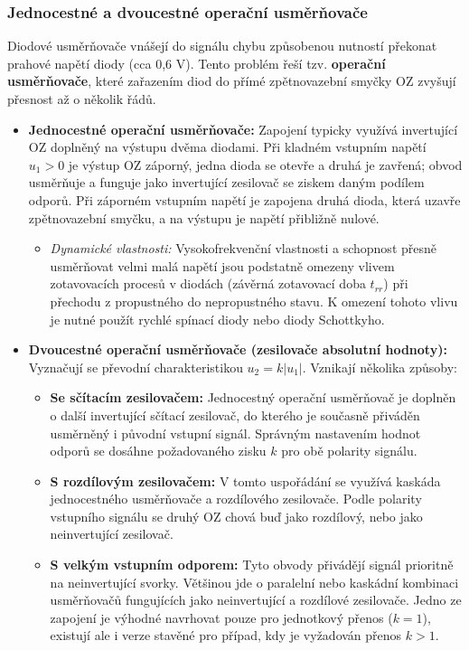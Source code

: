     \subsubsection{Jednocestné a dvoucestné operační usměrňovače}
        Diodové usměrňovače vnášejí do signálu chybu způsobenou nutností překonat prahové napětí diody (cca 0,6 V). Tento problém řeší tzv. \textbf{operační usměrňovače}, které zařazením diod do přímé zpětnovazební smyčky OZ zvyšují přesnost až o několik řádů.
        
        \begin{itemize}
            \item \textbf{Jednocestné operační usměrňovače:} Zapojení typicky využívá invertující OZ doplněný na výstupu dvěma diodami. Při kladném vstupním napětí $u_1 > 0$ je výstup OZ záporný, jedna dioda se otevře a druhá je zavřená; obvod usměrňuje a funguje jako invertující zesilovač se ziskem daným podílem odporů. Při záporném vstupním napětí je zapojena druhá dioda, která uzavře zpětnovazební smyčku, a na výstupu je napětí přibližně nulové.
            \begin{itemize}
                \item \textit{Dynamické vlastnosti:} Vysokofrekvenční vlastnosti a schopnost přesně usměrňovat velmi malá napětí jsou podstatně omezeny vlivem zotavovacích procesů v diodách (závěrná zotavovací doba $t_{rr}$) při přechodu z propustného do nepropustného stavu. K omezení tohoto vlivu je nutné použít rychlé spínací diody nebo diody Schottkyho.
            \end{itemize}
            \item \textbf{Dvoucestné operační usměrňovače (zesilovače absolutní hodnoty):} Vyznačují se převodní charakteristikou $u_2 = k|u_1|$. Vznikají několika způsoby:
            \begin{itemize}
                \item \textbf{Se sčítacím zesilovačem:} Jednocestný operační usměrňovač je doplněn o další invertující sčítací zesilovač, do kterého je současně přiváděn usměrněný i původní vstupní signál. Správným nastavením hodnot odporů se dosáhne požadovaného zisku $k$ pro obě polarity signálu.
                \item \textbf{S rozdílovým zesilovačem:} V tomto uspořádání se využívá kaskáda jednocestného usměrňovače a rozdílového zesilovače. Podle polarity vstupního signálu se druhý OZ chová buď jako rozdílový, nebo jako neinvertující zesilovač.
                \item \textbf{S velkým vstupním odporem:} Tyto obvody přivádějí signál prioritně na neinvertující svorky. Většinou jde o paralelní nebo kaskádní kombinaci usměrňovačů fungujících jako neinvertující a rozdílové zesilovače. Jedno ze zapojení je výhodné navrhovat pouze pro jednotkový přenos ($k = 1$), existují ale i verze stavěné pro případ, kdy je vyžadován přenos $k > 1$.

\end{itemize}
\end{itemize}
